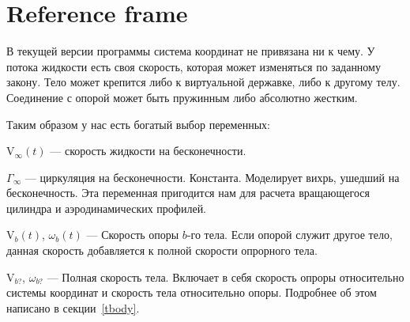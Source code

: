 \documentclass[a4paper,14pt]{extreport}
\newcommand{\comment}[1]{}
\newcommand{\br}[1]{\boldsymbol{\mathrm{#1}}}
\newenvironment{packed_itemize}{
\begin{itemize}
  \setlength{\itemsep}{1pt}
  \setlength{\parskip}{0pt}
  \setlength{\parsep}{0pt}
}{\end{itemize}}
\begin{document}
\section{Reference frame}
\label{refframe}
В текущей версии программы система координат не привязана ни к чему. У потока жидкости есть своя скорость, которая может изменяться по заданному закону. Тело может крепится либо к виртуальной державке, либо к другому телу. Соединение с опорой может быть пружинным либо абсолютно жестким.

Таким образом у нас есть богатый выбор переменных:
\begin{packed_itemize}
\item $\br V_\infty(t)$ --- скорость жидкости на бесконечности.
\item $\Gamma_{\infty}$ --- циркуляция на бесконечности. Константа. Моделирует вихрь, ушедший на бесконечность. Эта переменная пригодится нам для расчета вращающегося цилиндра и аэродинамических профилей.
\item $\br V_b(t)$, $\omega_b(t)$ --- Скорость опоры $b$-го тела. Если опорой служит другое тело, данная скорость добавляется к полной скорости опрорного тела.
\item $\br V_{b?}$, $\omega_{b?}$ --- Полная скорость тела. Включает в себя скорость опроры относительно системы координат и скорость тела относительно опоры. Подробнее об этом написано в секции~\ref{tbody}.
\end{packed_itemize}

\comment{Система координат используется правая. Это значит, если вы рисуете ось $Ox$ слева на право, а ось $Oy$ снизу вверх, то положительным направлением вращения будет являться вращение против часовой стрелки.

Помимо основной системы координат, имеется также система координат тела: $Ox_b y_b$. С основной системой координат она связана выражением
\begin{equation*}
\br r = \br r_c + \left(\begin{array}{cc}
\cos(\alpha) & -\sin(\alpha) \\
sin(\alpha) & \cos(\alpha) \end{array}\right) \cdot \br r_b
\end{equation*}
Центр поворота жестко связан с центром системы $Ox_b y_b$. Это нужно учитывать при загрузке тела. Система осчета тела используется только при загрузке. Везде внутри комплекса координаты тела записываются в основной системе. 
\begin{center}\end{center}
}
\end{document}
